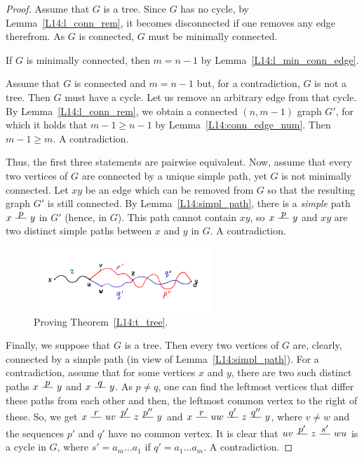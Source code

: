 \documentclass[12pt,notitlepage]{article}
\theoremstyle{plain}
\theoremstyle{definition}
\theoremstyle{plain}
\newcommand{\1}{\mathbf{1}}
\newcommand{\0}{\mathbf{0}}
\newcommand{\pth}[1]{\overset{\raisebox{0.25em}{$ #1 $}}{\relbar\hspace{-.8mm}\relbar}}
\begin{document}
\begin{proof}
Assume that $G$ is a tree. Since $G$ has no cycle, by Lemma~\ref{L14:l_conn_rem}, it becomes disconnected if one removes any edge therefrom. As $G$ is connected, $G$ must be minimally connected.

If $G$ is minimally connected, then $m = n - 1$ by Lemma~\ref{L14:l_min_conn_edge}.

Assume that $G$ is connected and $m = n - 1$ but, for a contradiction, $G$ is not a tree. Then $G$ must have a cycle. Let us remove an arbitrary edge from that cycle. By Lemma~\ref{L14:l_conn_rem}, we obtain a connected $(n, m - 1)$ graph $G'$, for which it holds that $m - 1 \geq n - 1$ by Lemma~\ref{L14:conn_edge_num}. Then $m - 1 \geq m$. A contradiction.

Thus, the first three statements are pairwise equivalent. Now, assume that every two vertices of $G$ are connected by a unique simple path, yet $G$ is not minimally connected. Let $x y$ be an edge which can be removed from $G$ so that the resulting graph $G'$ is still connected. By Lemma~\ref{L14:simpl_path}, there is a \emph{simple} path $x \pth{p} y$ in $G'$ (hence, in $G$). This path cannot contain $xy$, so $x \pth{p} y$ and $x y$ are two distinct simple paths between $x$ and $y$ in $G$. A contradiction.

\begin{figure}[h]
\centering
\includegraphics*[width=0.60\textwidth]{graph_tree_def.pdf}
\caption{Proving Theorem~\ref{L14:t_tree}.}
\end{figure}


Finally, we suppose that $G$ is a tree. Then every two vertices of $G$ are, clearly, connected by a simple path (in view of Lemma~\ref{L14:simpl_path}). For a contradiction, assume that for some vertices $x$ and $y$, there are two such distinct paths $x \pth{p} y$ and $x \pth{q} y$. As $p \neq q$, one can find the leftmost vertices that differ these paths from each other and then, the leftmost common vertex to the right of these. So, we get $x \pth{r} u v \pth{p'} z \pth{p''} y$ and $x \pth{r} u w \pth{q'} z \pth{q''} y$, where $v \neq w$ and the sequences $p'$ and $q'$ have no common vertex. It is clear that $u v \pth{p'} z \pth{s'} w u$ is a cycle in $G$, where $s' = a_m \ldots a_1$ if $q' = a_1 \ldots a_m$. A contradiction.
\end{proof}
\end{document}
